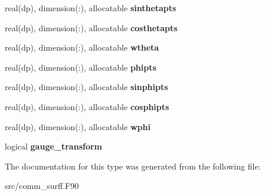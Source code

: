 \begin{DoxyCompactItemize}
real(dp), dimension(\+:), allocatable {\bfseries sinthetapts}
\item 
\mbox{\label{structcomm__surff_1_1rgrid_af284db90b14634b4d39be0d17e5d33f5}} 
real(dp), dimension(\+:), allocatable {\bfseries costhetapts}
\item 
\mbox{\label{structcomm__surff_1_1rgrid_a80c8b8be43596599b5e47fa22f0f3aea}} 
real(dp), dimension(\+:), allocatable {\bfseries wtheta}
\item 
\mbox{\label{structcomm__surff_1_1rgrid_adc89bec229b20816366a01c8b80b15b5}} 
real(dp), dimension(\+:), allocatable {\bfseries phipts}
\item 
\mbox{\label{structcomm__surff_1_1rgrid_a1c81288b089ca34c6c1c9bd52dd2efdc}} 
real(dp), dimension(\+:), allocatable {\bfseries sinphipts}
\item 
\mbox{\label{structcomm__surff_1_1rgrid_a9a9c08e70fb13b5f61993c941ea21942}} 
real(dp), dimension(\+:), allocatable {\bfseries cosphipts}
\item 
\mbox{\label{structcomm__surff_1_1rgrid_ace59fcc6d7cabfc555a7835670eff2fb}} 
real(dp), dimension(\+:), allocatable {\bfseries wphi}
\item 
\mbox{\label{structcomm__surff_1_1rgrid_a77df560b2853c3a533878e831a04ca11}} 
logical {\bfseries gauge\+\_\+transform}
\end{DoxyCompactItemize}


The documentation for this type was generated from the following file\+:\begin{DoxyCompactItemize}
\item 
src/comm\+\_\+surff.\+F90\end{DoxyCompactItemize}

